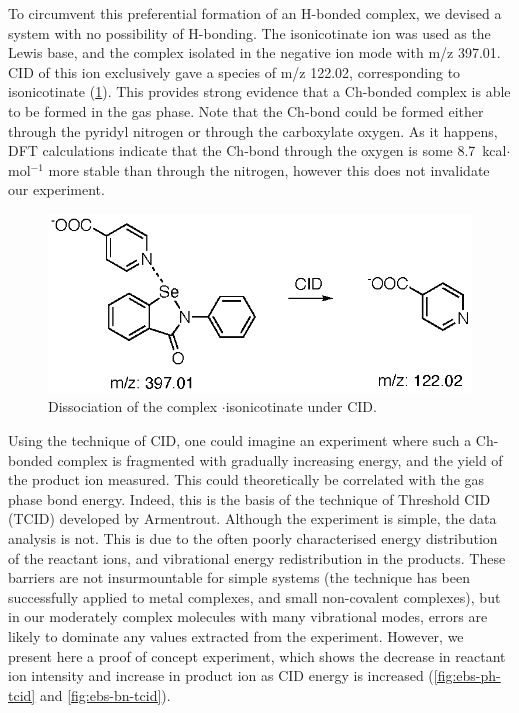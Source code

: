 \begin{refsection}
To circumvent this preferential formation of an H-bonded complex, we devised a system with no possibility of H-bonding.
The isonicotinate ion was used as the Lewis base, and the complex isolated in the negative ion mode with m/z 397.01.
CID of this ion exclusively gave a species of m/z 122.02, corresponding to isonicotinate (\cref{fig:neg-esi-ms}).
This provides strong evidence that a Ch-bonded complex is able to be formed in the gas phase.
Note that the Ch-bond could be formed either through the pyridyl nitrogen or through the carboxylate oxygen.
As it happens, DFT calculations indicate that the Ch-bond through the oxygen is some 8.7~kcal$\cdot$mol$^{-1}$ more stable than through the nitrogen, however this does not invalidate our experiment.


\begin{figure}
    \centering
    \includegraphics[scale=0.74]{Figures/neg-esi-ms.eps}
    \caption[Negative mode ESI of $ \cdot $isonicotinate.]{Dissociation of the complex $ \cdot $isonicotinate under CID.}\label{fig:neg-esi-ms}
\end{figure}

Using the technique of CID, one could imagine an experiment where such a Ch-bonded complex is fragmented with gradually increasing energy, and the yield of the product ion measured.
This could theoretically be correlated with the gas phase bond energy.
Indeed, this is the basis of the technique of Threshold CID (TCID) developed by Armentrout.\autocite{Armentrout2003,Rodgers2000,Narancic2007}
Although the experiment is simple, the data analysis is not.
This is due to the often poorly characterised energy distribution of the reactant ions, and vibrational energy redistribution in the products.
These barriers are not insurmountable for simple systems (the technique has been successfully applied to metal complexes, and small non-covalent complexes), but in our moderately complex molecules with many vibrational modes, errors are likely to dominate any values extracted from the experiment.
However, we present here a proof of concept experiment, which shows the decrease in reactant ion intensity and increase in product ion as CID energy is increased (\cref{fig:ebs-ph-tcid} and \cref{fig:ebs-bn-tcid}).


\end{refsection}

